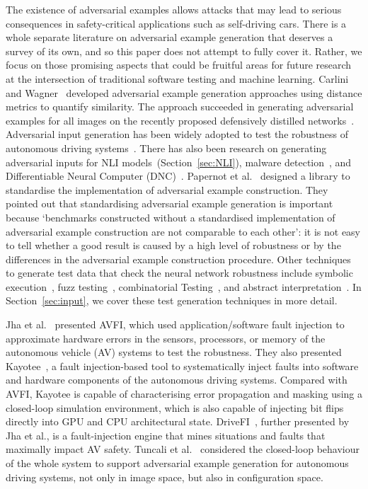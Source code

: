 The existence of adversarial examples allows attacks that may lead to serious consequences in safety-critical applications such as self-driving cars.
There is a whole separate literature on adversarial example generation that deserves a survey of its own, and so this paper does not attempt to fully cover it. Rather, we focus on those promising aspects that could be fruitful areas for future research at the intersection of traditional software testing and machine learning.
Carlini and Wagner~
developed adversarial example generation approaches using distance metrics to quantify similarity.
The approach succeeded in generating adversarial examples for all images on the recently proposed defensively distilled networks~. 
Adversarial input generation has been widely adopted to test the robustness of autonomous driving systems~.
There has also been research on generating adversarial inputs for NLI models~(Section~\ref{sec:NLI}), malware detection~, and Differentiable Neural Computer (DNC)~.
Papernot et al.~ designed a library to standardise the implementation of adversarial example construction.
They pointed out that standardising adversarial example generation is important because `benchmarks constructed without a
standardised implementation of adversarial example construction are not
comparable to each other': it is not easy to tell whether a good result is caused by a high level of robustness or by the differences in the adversarial example construction procedure.
Other techniques to generate test data that check the neural network robustness include symbolic execution~, fuzz testing~, combinatorial Testing~,
and abstract interpretation~. 
In Section~\ref{sec:input}, we cover these test generation techniques in more detail.

Jha et al.~ presented AVFI, which used application/software fault injection to approximate hardware errors in the sensors, processors, or memory of the autonomous vehicle (AV) systems to test the robustness.
They also presented Kayotee~, a fault injection-based tool to systematically inject faults into software and hardware components of the autonomous driving systems. Compared with AVFI, Kayotee is capable of
characterising error propagation and masking
using a closed-loop simulation environment, which is also capable
of injecting bit flips directly into GPU and CPU architectural
state.
DriveFI~, further presented by Jha et al., is a fault-injection engine that mines situations and faults that maximally impact AV safety.
Tuncali et al.~ considered the closed-loop behaviour of the whole system to support adversarial example generation for autonomous driving systems, not only in image space, but also in configuration space.

